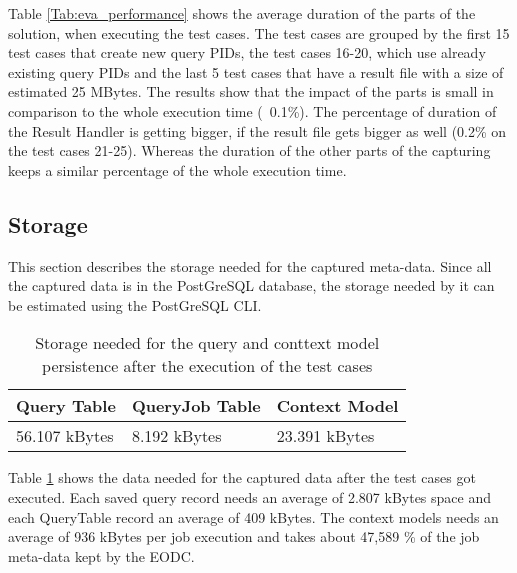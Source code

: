 \documentclass[draft,final]{vutinfth} %
\begin{document}
Table \ref{Tab:eva_performance} shows the average duration of the parts of the solution, when executing the test cases. The test cases are grouped by the first 15 test cases that create new query PIDs, the test cases 16-20, which use already existing query PIDs and the last 5 test cases that have a result file with a size of estimated 25 MBytes. The results show that the impact of the parts is small in comparison to the whole execution time (~0.1\%). The percentage of duration of the Result Handler is getting bigger, if the result file gets bigger as well (0.2\% on the test cases 21-25). Whereas the duration of the other parts of the capturing keeps a similar percentage of the whole execution time. 


\subsection{Storage}\label{Evaluation:impact_stor}
This section describes the storage needed for the captured meta-data. Since all the captured data is in the PostGreSQL database, the storage needed by it can be estimated using the PostGreSQL CLI.

\begin{table}[]
	\caption{Storage needed for the query and conttext model persistence after the execution of the test cases}
	\centering
	\begin{tabular}{l|l|l}
		\textbf{Query Table} & \textbf{QueryJob Table} & \textbf{Context Model}  \\ \hline
		56.107 kBytes & 8.192 kBytes & 23.391 kBytes  \\ 
	\end{tabular}
	\label{Tab:eva_storage}
\end{table}

Table \ref{Tab:eva_storage} shows the data needed for the captured data after the test cases got executed. Each saved query record needs an average of 2.807 kBytes space and each QueryTable record an average of 409 kBytes. The context models needs an average of 936 kBytes per job execution and takes about 47,589 \% of the job meta-data kept by the EODC.   
\end{document}
